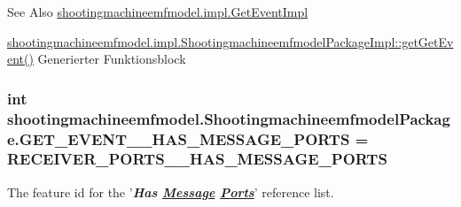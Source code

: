 \begin{DoxySeeAlso}{See Also}
\hyperlink{classshootingmachineemfmodel_1_1impl_1_1_get_event_impl}{shootingmachineemfmodel.\-impl.\-Get\-Event\-Impl} 

\hyperlink{classshootingmachineemfmodel_1_1impl_1_1_shootingmachineemfmodel_package_impl_afdfe7cab56afecf4b421d94f8b82aebe}{shootingmachineemfmodel.\-impl.\-Shootingmachineemfmodel\-Package\-Impl\-::get\-Get\-Event()} Generierter Funktionsblock 
\end{DoxySeeAlso}
\hypertarget{interfaceshootingmachineemfmodel_1_1_shootingmachineemfmodel_package_a4ab331e8bfd030492ae5d6194070c1d7}{
\subsubsection[{G\-E\-T\-\_\-\-E\-V\-E\-N\-T\-\_\-\-\_\-\-H\-A\-S\-\_\-\-M\-E\-S\-S\-A\-G\-E\-\_\-\-P\-O\-R\-T\-S}]{\setlength{\rightskip}{0pt plus 5cm}int shootingmachineemfmodel.\-Shootingmachineemfmodel\-Package.\-G\-E\-T\-\_\-\-E\-V\-E\-N\-T\-\_\-\-\_\-\-H\-A\-S\-\_\-\-M\-E\-S\-S\-A\-G\-E\-\_\-\-P\-O\-R\-T\-S = {\bf R\-E\-C\-E\-I\-V\-E\-R\-\_\-\-P\-O\-R\-T\-S\-\_\-\-\_\-\-H\-A\-S\-\_\-\-M\-E\-S\-S\-A\-G\-E\-\_\-\-P\-O\-R\-T\-S}}}\label{interfaceshootingmachineemfmodel_1_1_shootingmachineemfmodel_package_a4ab331e8bfd030492ae5d6194070c1d7}
The feature id for the '{\itshape {\bfseries Has \hyperlink{interfaceshootingmachineemfmodel_1_1_message}{Message} \hyperlink{interfaceshootingmachineemfmodel_1_1_ports}{Ports}}}' reference list.

